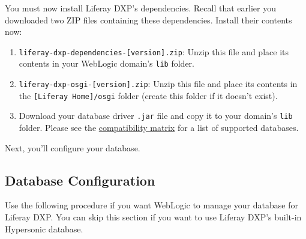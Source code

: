 You must now install Liferay DXP's dependencies. Recall that earlier you
downloaded two ZIP files containing these dependencies. Install their
contents now:

\begin{enumerate}
\def\labelenumi{\arabic{enumi}.}
\item
  \texttt{liferay-dxp-dependencies-{[}version{]}.zip}: Unzip this file
  and place its contents in your WebLogic domain's \texttt{lib} folder.
\item
  \texttt{liferay-dxp-osgi-{[}version{]}.zip}: Unzip this file and place
  its contents in the \texttt{{[}Liferay\ Home{]}/osgi} folder (create
  this folder if it doesn't exist).
\item
  Download your database driver \texttt{.jar} file and copy it to your
  domain's \texttt{lib} folder. Please see the
  \href{https://web.liferay.com/documents/14/21598941/Liferay+DXP+7.1+Compatibility+Matrix/9f9c917a-c620-427b-865d-5c4b4a00be85}{compatibility
  matrix} for a list of supported databases.
\end{enumerate}

Next, you'll configure your database.

\subsection{Database Configuration}\label{database-configuration-4}

Use the following procedure if you want WebLogic to manage your database
for Liferay DXP. You can skip this section if you want to use Liferay
DXP's built-in Hypersonic database.

